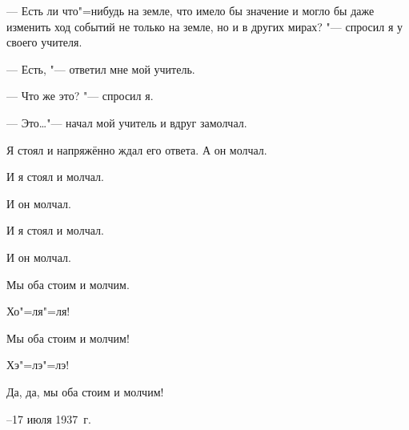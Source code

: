 --- Есть ли что"=нибудь на земле, что имело бы значение и могло бы даже изменить
ход событий не только на земле, но и в других мирах? "--- спросил я у своего учителя.

--- Есть, "--- ответил мне мой учитель.

--- Что же это? "--- спросил я.

--- Это\dots "--- начал мой учитель и вдруг замолчал.

Я стоял и напряжённо ждал его ответа. А он молчал.

И я стоял и молчал.

И он молчал.

И я стоял и молчал.

И он молчал.

Мы оба стоим и молчим.

Хо"=ля"=ля!

Мы оба стоим и молчим!

Хэ"=лэ"=лэ!

Да, да, мы оба стоим и молчим!

\medskip
{}--17 июля 1937~г.